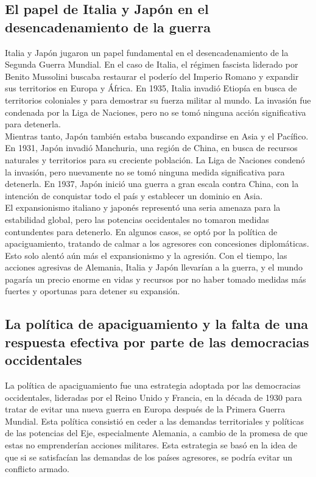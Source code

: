 \documentclass{article}
\theoremstyle{mytheoremstyle}
\theoremstyle{mytheoremstyle}
\theoremstyle{myproblemstyle}
\begin{document}
    \subsection{El papel de Italia y Japón en el desencadenamiento de la guerra}
Italia y Japón jugaron un papel fundamental en el desencadenamiento de la Segunda Guerra Mundial. En el caso de Italia, el régimen fascista liderado por Benito Mussolini buscaba restaurar el poderío del Imperio Romano y expandir sus territorios en Europa y África. En 1935, Italia invadió Etiopía en busca de territorios coloniales y para demostrar su fuerza militar al mundo. La invasión fue condenada por la Liga de Naciones, pero no se tomó ninguna acción significativa para detenerla.\\

Mientras tanto, Japón también estaba buscando expandirse en Asia y el Pacífico. En 1931, Japón invadió Manchuria, una región de China, en busca de recursos naturales y territorios para su creciente población. La Liga de Naciones condenó la invasión, pero nuevamente no se tomó ninguna medida significativa para detenerla. En 1937, Japón inició una guerra a gran escala contra China, con la intención de conquistar todo el país y establecer un dominio en Asia.\\

El expansionismo italiano y japonés representó una seria amenaza para la estabilidad global, pero las potencias occidentales no tomaron medidas contundentes para detenerlo. En algunos casos, se optó por la política de apaciguamiento, tratando de calmar a los agresores con concesiones diplomáticas. Esto solo alentó aún más el expansionismo y la agresión. Con el tiempo, las acciones agresivas de Alemania, Italia y Japón llevarían a la guerra, y el mundo pagaría un precio enorme en vidas y recursos por no haber tomado medidas más fuertes y oportunas para detener su expansión.\\

    \subsection{La política de apaciguamiento y la falta de una respuesta efectiva por parte de las democracias occidentales}

    La política de apaciguamiento fue una estrategia adoptada por las democracias occidentales, lideradas por el Reino Unido y Francia, en la década de 1930 para tratar de evitar una nueva guerra en Europa después de la Primera Guerra Mundial. Esta política consistió en ceder a las demandas territoriales y políticas de las potencias del Eje, especialmente Alemania, a cambio de la promesa de que estas no emprenderían acciones militares. Esta estrategia se basó en la idea de que si se satisfacían las demandas de los países agresores, se podría evitar un conflicto armado.\\
\end{document}
